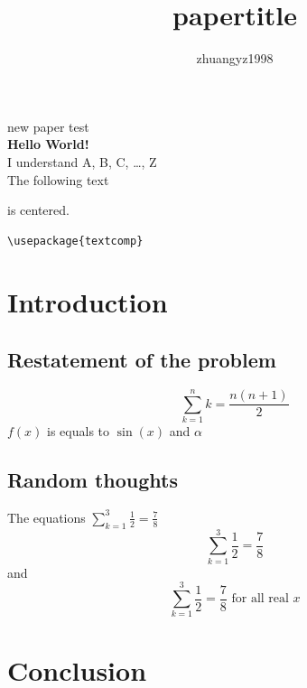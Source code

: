 \documentclass[12pt]{article}
\author{zhuangyz1998}
\title{papertitle}
\begin{document}
 
\maketitle  new paper test\\%
\textbf{Hello World!}\\
I understand A, B, C, \ldots, Z\\
The following text
\begin{center}
is centered.
\end{center}
\begin{verbatim}
\usepackage{textcomp}
\end{verbatim}

\tableofcontents

\section{Introduction}
\subsection{Restatement of the problem}
$$ \sum_{k=1}^n k = \frac{n(n+1)}{2} $$
$f(x)$ is equals to $\sin(x)$ and $\alpha$

\subsection{Random thoughts}
The equations
$\sum_{k=1}^3 \frac{1}{2} = \frac{7}{8}$
\begin{equation}
\sum_{k=1}^3 \frac{1}{2} = \frac{7}{8}
\end{equation}
and
\begin{equation*}
\sum_{k=1}^3 \frac{1}{2} = \frac{7}{8} \text{ for all real } x
\end{equation*}

\section{Conclusion}
\end{document}
